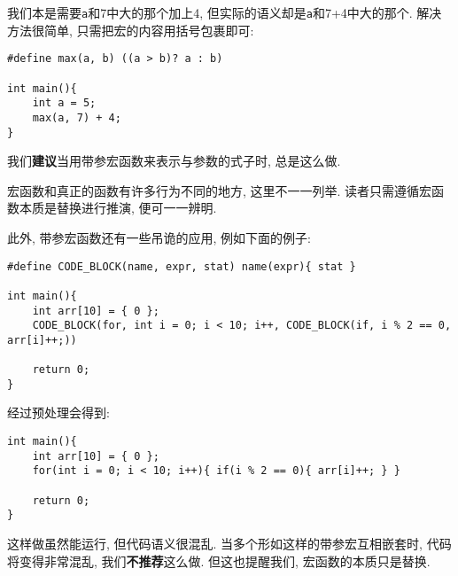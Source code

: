         我们本是需要\texttt{a}和7中大的那个加上4, 但实际的语义却是\texttt{a}和7+4中大的那个. 解决方法很简单, 只需把宏的内容用括号包裹即可:
\begin{lstlisting}
#define max(a, b) ((a > b)? a : b)

int main(){
    int a = 5;
    max(a, 7) + 4;
}
\end{lstlisting}

        我们\textbf{建议}当用带参宏函数来表示与参数的式子时, 总是这么做.

        宏函数和真正的函数有许多行为不同的地方, 这里不一一列举. 读者只需遵循宏函数本质是替换进行推演, 便可一一辨明.

        此外, 带参宏函数还有一些吊诡的应用, 例如下面的例子:
\begin{lstlisting}
#define CODE_BLOCK(name, expr, stat) name(expr){ stat }

int main(){
    int arr[10] = { 0 };
    CODE_BLOCK(for, int i = 0; i < 10; i++, CODE_BLOCK(if, i % 2 == 0, arr[i]++;))

    return 0;
}
\end{lstlisting}
        经过预处理会得到:
\begin{lstlisting}
int main(){
    int arr[10] = { 0 };
    for(int i = 0; i < 10; i++){ if(i % 2 == 0){ arr[i]++; } }

    return 0;
}
\end{lstlisting}

        这样做虽然能运行, 但代码语义很混乱. 当多个形如这样的带参宏互相嵌套时, 代码将变得非常混乱, 我们\textbf{不推荐}这么做. 但这也提醒我们, 宏函数的本质只是替换.